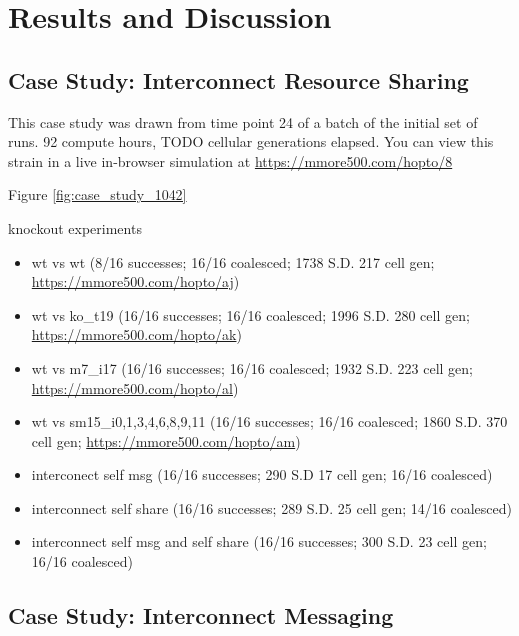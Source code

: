 \section{Results and Discussion} \label{sec:results}









% 

\subsection{Case Study: Interconnect Resource Sharing}



This case study was drawn from time point 24 of a batch of the initial set of runs.
92 compute hours, TODO cellular generations elapsed.
You can view this strain in a live in-browser simulation at \url{https://mmore500.com/hopto/8}

Figure \ref{fig:case_study_1042}

knockout experiments
\begin{itemize}
  \item wt vs wt (8/16 successes; 16/16 coalesced; 1738 S.D. 217 cell gen; \url{https://mmore500.com/hopto/aj})
  \item wt vs ko\_t19 (16/16 successes; 16/16 coalesced; 1996 S.D. 280 cell gen; \url{https://mmore500.com/hopto/ak})
  \item wt vs m7\_i17 (16/16 successes; 16/16 coalesced; 1932 S.D. 223 cell gen;  \url{https://mmore500.com/hopto/al})
  \item wt vs sm15\_i0,1,3,4,6,8,9,11 (16/16 successes; 16/16 coalesced; 1860 S.D. 370 cell gen; \url{https://mmore500.com/hopto/am})
  \item interconect self msg (16/16 successes; 290 S.D 17 cell gen; 16/16 coalesced)
  \item interconnect self share (16/16 successes; 289 S.D. 25 cell gen;  14/16 coalesced)
  \item interconnect self msg and self share (16/16 successes; 300 S.D. 23 cell gen; 16/16 coalesced)
\end{itemize}

\subsection{Case Study: Interconnect Messaging}

